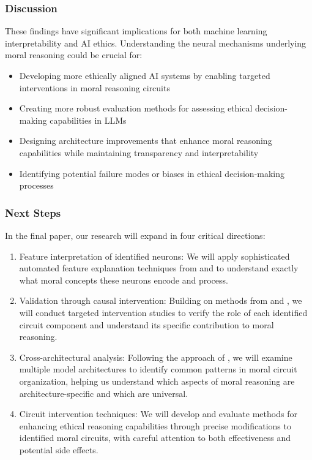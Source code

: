 \subsubsection*{Discussion}

These findings have significant implications for both machine learning interpretability and AI ethics. Understanding the neural mechanisms underlying moral reasoning could be crucial for:

\begin{itemize}
    \item Developing more ethically aligned AI systems by enabling targeted interventions in moral reasoning circuits
    \item Creating more robust evaluation methods for assessing ethical decision-making capabilities in LLMs
    \item Designing architecture improvements that enhance moral reasoning capabilities while maintaining transparency and interpretability
    \item Identifying potential failure modes or biases in ethical decision-making processes
\end{itemize}


\subsubsection*{Next Steps} In the final paper, our research will expand in four critical directions:

 \begin{enumerate} 

\item Feature interpretation of identified neurons: We will apply sophisticated automated feature explanation techniques from \cite{bills2023language} and \cite{choi2024automatic} to understand exactly what moral concepts these neurons encode and process.

\item Validation through causal intervention: Building on methods from \cite{stolfo_mechanistic_2023} and \cite{geiger_causal_2024}, we will conduct targeted intervention studies to verify the role of each identified circuit component and understand its specific contribution to moral reasoning.

\item Cross-architectural analysis: Following the approach of \cite{ferrando_similarity_2024}, we will examine multiple model architectures to identify common patterns in moral circuit organization, helping us understand which aspects of moral reasoning are architecture-specific and which are universal.

\item Circuit intervention techniques: We will develop and evaluate methods for enhancing ethical reasoning capabilities through precise modifications to identified moral circuits, with careful attention to both effectiveness and potential side effects.

\end{enumerate}




